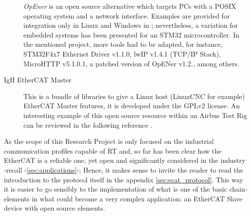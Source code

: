 \begin{description}
    \emph{OpEner} is an open source alternative which targets PCs with a POSIX operating system and a network interface. 
    Examples are provided for integration only in Linux and Windows in \cite{opener_stack}; %
    nevertheless, a variation for embedded systems has been presented for an STM32 microcontroller. In the mentioned project, more tools had to be adapted, for instance,
    STM32F4x7 Ethernet Driver v1.1.0, lwIP v1.4.1 (TCP/IP Stack), MicroHTTP v5.1.0.1, a patched version of OpENer v1.2., among others.\cite{opener_stm32}%
    \item[IgH EtherCAT Master] This is a bundle of libraries to give a Linux host (LinuxCNC for example) EtherCAT Master features, it is developed under the GPLv2 license. 
    An interesting example of this open source resource within an Airbus Test Rig can be reviewed in the following reference \cite{ecatstack_igh}. %
\end{description}

As the scope of this Research Project is only focused on the industrial communication profiles capable of RT and, so far has been clear how 
the EtherCAT is a reliable one, yet open and significantly considered in the industry -recall -\ref{sec:applications}-; 
Hence, it makes sense to invite the reader to read the introduction to the protocol itself in the appendix \ref{sec:ecat_protocol}. 
This way it is easier to go sensibly to the implementation of what is one of the basic chain-elements in what could become a very complex application: 
an EtherCAT Slave device with open source elements.

